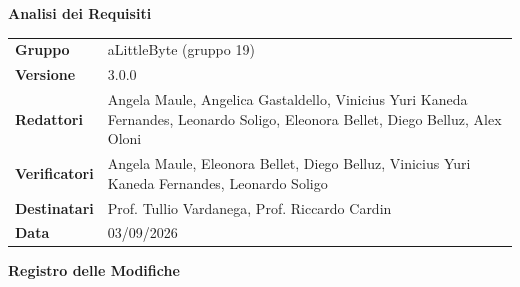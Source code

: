 ﻿\documentclass[a4paper,12pt]{article}
\begin{document}
\thispagestyle{firstpage}

\vspace*{0.5cm}

\begin{center}
    {\LARGE \textbf{Analisi dei Requisiti}}
\end{center}

\vspace{1.5cm}

\begin{center}
    \renewcommand{\arraystretch}{1.3}
    \begin{tcolorbox}[
        width=0.92\textwidth,
        colback=gray!6,
        colframe=gray!45,
        boxrule=0.5pt,
        arc=2mm,
        boxsep=0pt,
        left=8pt, right=8pt, top=8pt, bottom=8pt
    ]
        \begin{tabularx}{\linewidth}{>{\bfseries}p{3.5cm} X}
            Gruppo      & aLittleByte (gruppo 19) \\
            Versione    & 3.0.0 \\
            Redattori   & Angela Maule, Angelica Gastaldello, Vinicius Yuri Kaneda Fernandes, Leonardo Soligo, Eleonora Bellet, Diego Belluz, Alex Oloni\\
            Verificatori & Angela Maule, Eleonora Bellet, Diego Belluz, Vinicius Yuri Kaneda Fernandes, Leonardo Soligo\\
            Destinatari & Prof. Tullio Vardanega, Prof. Riccardo Cardin \\
            Data        & 03/09/2026\\
        \end{tabularx}
    \end{tcolorbox}
\end{center}



\begin{center}
    {\Large \textbf{Registro delle Modifiche}}
\end{center}

\vspace{0.35cm}
\end{document}
